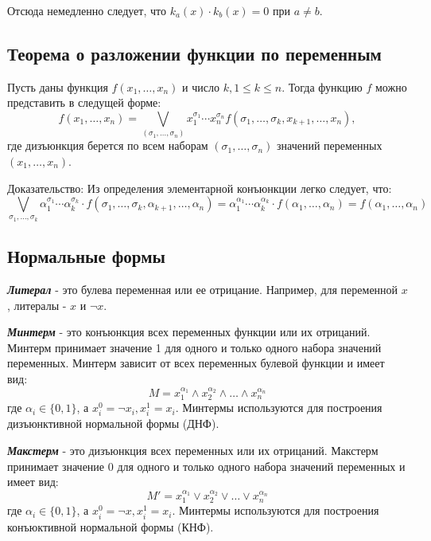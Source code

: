 \documentclass[12pt,letterpaper]{article}
\begin{document}
Отсюда немедленно следует, что \(k_a(x) \cdot k_b(x) = 0\) при \(a \neq b\).

\subsection{Теорема о разложении функции по переменным}

Пусть даны функция \(f(x_1, \ldots , x_n)\) и число \(k, 1 \leq k \leq n\). Тогда функцию \(f\) можно представить в следущей форме:
\[f(x_1, \ldots, x_n) =  \bigvee_{(\sigma_1, \ldots, \sigma_n)} x_1 ^ {\sigma_1} \cdots x_n ^ {\sigma_n} f(\sigma_1, \ldots, \sigma_k, x_{k+1}, \ldots, x_n), \]
где дизъюнкция берется по всем наборам \((\sigma_1, \ldots, \sigma_n)\) значений переменных \((x_1, \ldots, x_n)\).

Доказательство: Из определения элементарной конъюнкции легко следует, что:
\[\bigvee_{\sigma_1, \ldots, \sigma_k} \alpha_1 ^ {\sigma_1} \cdots \alpha_k ^ {\sigma_k} \cdot f(\sigma_1, \ldots, \sigma_k, \alpha_{k+1}, \ldots, \alpha_n) = \alpha_1 ^ {\alpha_1} \cdots \alpha_k ^ {\alpha_k} \cdot f(\alpha_1, \ldots, \alpha_n) = f(\alpha_1, \ldots, \alpha_n)\]

\subsection{Нормальные формы}

\textbf{\emph{Литерал}} - это булева переменная или ее отрицание. Например, для переменной \(x\), литералы - \(x\) и \(\neg x\).

\textbf{\emph{Минтерм}} - это конъюнкция всех переменных функции или их отрицаний. Минтерм принимает значение 1 для одного и только одного набора значений переменных. Минтерм зависит от всех переменных булевой функции и имеет вид:
\[M = x_1 ^ {\alpha_1} \wedge x_2 ^ {\alpha_2} \wedge \ldots \wedge x_n ^ {\alpha_n}\]
где \(\alpha_i \in \{0, 1\}\), а \(x_i ^ 0 = \neg x_i, x_i ^ 1 = x_i\). Минтермы используются для построения дизъюнктивной нормальной формы (ДНФ).

\textbf{\emph{Макстерм}} - это дизъюнкция всех переменных или их отрицаний. Макстерм принимает значение 0 для одного и только одного набора значений переменных и имеет вид:
\[M' = x_1 ^ {\alpha_1} \vee x_2 ^ {\alpha_2} \vee \ldots \vee x_n ^ {\alpha_n}\]
где \(\alpha_i \in \{0, 1\}\), а \(x_i ^ 0 = \neg x, x_i ^ 1 = x_i\). Минтермы используются для построения конъюктивной нормальной формы (КНФ).
\end{document}
